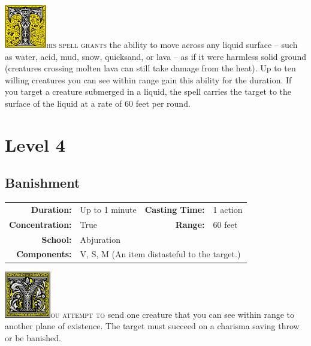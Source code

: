 \documentclass[12pt,showtrims]{memoir}
\begin{document}
\vspace{1\baselineskip}\noindent
\lettrine[lines=4]{\includegraphics[height=54pt]{initials/T.png}}{his spell grants} the ability to move across any liquid surface -- such as water, acid, mud, snow, quicksand, or lava -- as if it were harmless solid ground (creatures crossing molten lava can still take damage from the heat). Up to ten willing creatures you can see within range gain this ability for the duration. If you target a creature submerged in a liquid, the spell carries the target to the surface of the liquid at a rate of 60 feet per round.

\newpage
\begin{figure}[p]
\end{figure}
\newpage
\FloatBarrier
\chapter*{Level 4} 
\section*{Banishment}

{
\small\centering\vspace{-6pt}
\begin{tabular}{rlrl}
\toprule

\textbf{Duration:} & Up to 1 minute &
\textbf{Casting Time:} & 1 action \\
\textbf{Concentration:} & True &
\textbf{Range:} & 60 feet \\
\textbf{School:} & Abjuration \\
\textbf{Components:} & \multicolumn{3}{p{0.7\textwidth}}{V, S, M (An item distasteful to the target.)}\\

\bottomrule
\end{tabular}
}

\vspace{1\baselineskip}\noindent 
\lettrine[lines=4]{\includegraphics[height=58pt]{initials/Y.png}}{ou attempt to} send one creature that you can see within range to another plane of existence. The target must succeed on a charisma saving throw or be banished. 
\end{document}

